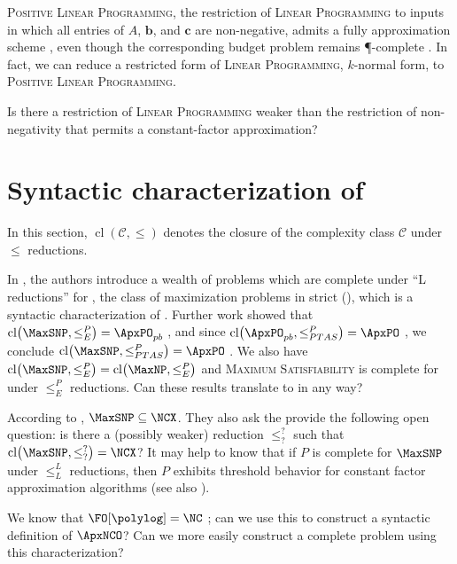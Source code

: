 \documentclass[]{article}
\newcommand{\cl}{\operatorname{cl}}
\let\originalleft\left
\let\originalright\right
\renewcommand{\left}{\mathopen{}\mathclose\bgroup\originalleft}
\renewcommand{\right}{\aftergroup\egroup\originalright}
\begin{document}
\textsc{Positive Linear Programming}, the restriction of \textsc{Linear Programming} to inputs in which all entries of $A$, $\mathbf{b}$, and $\mathbf{c}$ are non-negative, admits a fully \NC{} approximation scheme \cite{ln93}, even though the corresponding budget problem remains \P-complete \cite{tx98}.
In fact, we can reduce a restricted form of \textsc{Linear Programming}, $k$-normal form, to \textsc{Positive Linear Programming}. \cite{trevisan00}
\begin{openquestion}
  Is there a restriction of \textsc{Linear Programming} weaker than the restriction of non-negativity that permits a constant-factor \NC{} approximation?
\end{openquestion}

\section{Syntactic characterization of \texorpdfstring{\ApxNCO}{ApxNCO}}

In this section, $\cl(\mathcal{C}, \leq)$ denotes the closure of the complexity class $\mathcal{C}$ under $\leq$ reductions.

In \cite{py91}, the authors introduce a wealth of problems which are complete under ``L reductions'' for \MaxSNP, the class of maximization problems in strict \NP{} (\SNP), which is a syntactic characterization of \NP.
Further work showed that $\cl\left(\MaxSNP, \leq^P_E\right) = \ApxPO_{pb}$ \cite[Theorem~1]{kmsv99}, and since $\cl\left(\ApxPO_{pb}, \leq^P_{PTAS}\right) = \ApxPO$ \cite{ct00}, we conclude $\cl\left(\MaxSNP, \leq^P_{PTAS}\right) = \ApxPO$ \cite{kmsv99}.
We also have $\cl\left(\MaxSNP, \leq^P_E\right) = \cl\left(\MaxNP, \leq^P_E\right)$ \cite[Theorem~2]{kmsv99} and \textsc{Maximum Satisfiability} is complete for \MaxNP{} under $\leq^P_E$ reductions.
Can these results translate to \NC{} in any way?

According to \cite[Theorem~9.1.3]{dsst97}, $\MaxSNP \subseteq \NCX$.
They also ask the provide the following open question: is there a (possibly weaker) reduction $\leq^?_?$ such that $\cl\left(\MaxSNP, \leq^?_?\right) = \NCX$?
It may help to know that if $P$ is complete for $\MaxSNP$ under $\leq^L_L$ reductions, then $P$ exhibits threshold behavior for constant factor \NC{} approximation algorithms \cite[Theorem~9]{sx95} (see also \cite[Theorem~9.2.3]{dsst97}).

\begin{todo}
  We know that $\FO[\polylog] = \NC$ \cite[Theorem~5.2]{immerman99}; can we use this to construct a syntactic definition of $\ApxNCO$?
  Can we more easily construct a complete problem using this characterization?
\end{todo}
\end{document}
